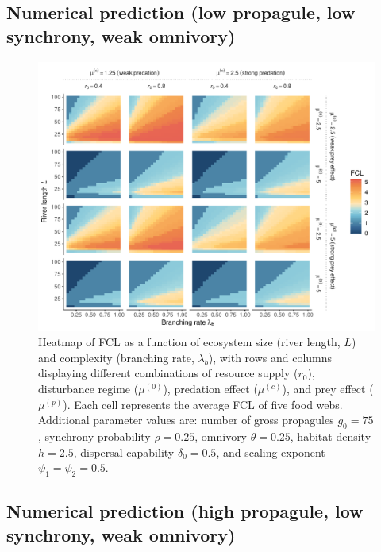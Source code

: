 \subsection{Numerical prediction (low propagule, low synchrony, weak
omnivory)}\label{numerical-prediction-low-propagule-low-synchrony-weak-omnivory}

\begin{figure}
\centering
\includegraphics{../data_fmt/fig_rho025_g75_theta025.pdf}
\caption{Heatmap of FCL as a function of ecosystem size (river length,
\(L\)) and complexity (branching rate, \(\lambda_b\)), with rows and
columns displaying different combinations of resource supply (\(r_0\)),
disturbance regime (\(\mu^{(0)}\)), predation effect (\(\mu^{(c)}\)),
and prey effect (\(\mu^{(p)}\)). Each cell represents the average FCL of
five food webs. Additional parameter values are: number of gross
propagules \(g_0=75\), synchrony probability \(\rho=0.25\), omnivory
\(\theta=0.25\), habitat density \(h=2.5\), dispersal capability
\(\delta_0=0.5\), and scaling exponent \(\psi_1=\psi_2=0.5\).}
\end{figure}

\newpage

\subsection{Numerical prediction (high propagule, low synchrony, weak
omnivory)}\label{numerical-prediction-high-propagule-low-synchrony-weak-omnivory}

